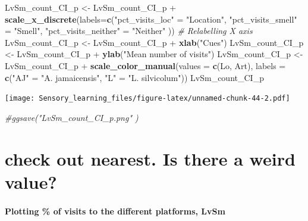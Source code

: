 \documentclass[]{article}
\newenvironment{Shaded}{\begin{snugshade}}{\end{snugshade}}
\newcommand{\KeywordTok}[1]{\textcolor[rgb]{0.13,0.29,0.53}{\textbf{{#1}}}}
\newcommand{\DataTypeTok}[1]{\textcolor[rgb]{0.13,0.29,0.53}{{#1}}}
\newcommand{\StringTok}[1]{\textcolor[rgb]{0.31,0.60,0.02}{{#1}}}
\newcommand{\CommentTok}[1]{\textcolor[rgb]{0.56,0.35,0.01}{\textit{{#1}}}}
\newcommand{\NormalTok}[1]{{#1}}
\let\oldparagraph\paragraph
\renewcommand{\paragraph}[1]{\oldparagraph{#1}\mbox{}}
\begin{document}
\begin{Shaded}
\begin{Highlighting}[]
\NormalTok{LvSm_count_CI_p <-}\StringTok{ }\NormalTok{LvSm_count_CI_p +}\StringTok{ }\KeywordTok{scale_x_discrete}\NormalTok{(}\DataTypeTok{labels=}\KeywordTok{c}\NormalTok{(}\StringTok{"pct_visits_loc"} \NormalTok{=}\StringTok{ "Location"}\NormalTok{, }\StringTok{"pct_visits_smell"} \NormalTok{=}\StringTok{ "Smell"}\NormalTok{,}
                              \StringTok{"pct_visits_neither"} \NormalTok{=}\StringTok{ "Neither"} \NormalTok{))  }\CommentTok{# Relabelling X axis}
\NormalTok{LvSm_count_CI_p <-}\StringTok{ }\NormalTok{LvSm_count_CI_p +}\StringTok{ }\KeywordTok{xlab}\NormalTok{(}\StringTok{"Cues"}\NormalTok{)}
\NormalTok{LvSm_count_CI_p <-}\StringTok{ }\NormalTok{LvSm_count_CI_p +}\StringTok{ }\KeywordTok{ylab}\NormalTok{(}\StringTok{"Mean number of visits"}\NormalTok{)}
\NormalTok{LvSm_count_CI_p <-}\StringTok{ }\NormalTok{LvSm_count_CI_p +}\StringTok{ }\KeywordTok{scale_color_manual}\NormalTok{(}\DataTypeTok{values =} \KeywordTok{c}\NormalTok{(Lo, Art), }\DataTypeTok{labels =} \KeywordTok{c}\NormalTok{(}\StringTok{"AJ"} \NormalTok{=}\StringTok{ "A. jamaicensis"}\NormalTok{, }\StringTok{"L"} \NormalTok{=}\StringTok{ "L. silvicolum"}\NormalTok{))}
\NormalTok{LvSm_count_CI_p }
\end{Highlighting}
\end{Shaded}

\texttt{[image: Sensory\_learning\_files/figure-latex/unnamed-chunk-44-2.pdf]}

\begin{Shaded}
\begin{Highlighting}[]
\CommentTok{#ggsave("LvSm_count_CI_p.png" )}
\end{Highlighting}
\end{Shaded}

\section{check out nearest. Is there a weird
value?}\label{check-out-nearest.-is-there-a-weird-value}

\paragraph{Plotting \% of visits to the different platforms,
LvSm}\label{plotting-of-visits-to-the-different-platforms-lvsm}
\end{document}

